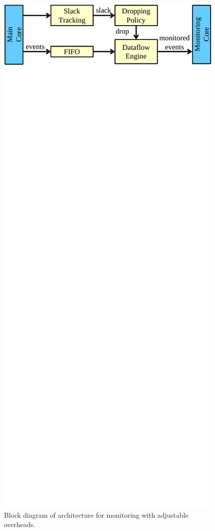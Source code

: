 \begin{figure}
\begin{center}
    \includegraphics[width=\columnwidth]{figs/drop_overview.pdf}
    \vspace{-0.3in}
    \caption{Block diagram of architecture for monitoring with adjustable overheads.}
    \label{fig:drop.overview}
    \vspace{-0.1in}
  \end{center}
\end{figure}

